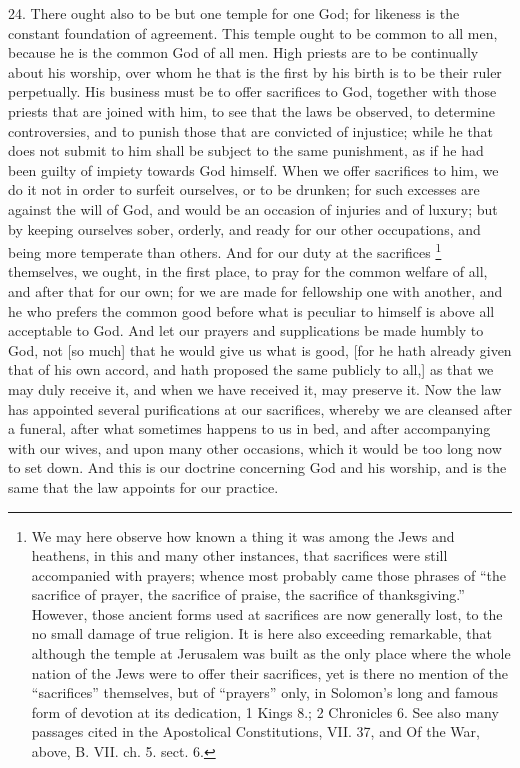 24. There ought also to be but one temple for one God; for likeness is the
constant foundation of agreement. This temple ought to be common to all
men, because he is the common God of all men. High priests are to be
continually about his worship, over whom he that is the first by his birth
is to be their ruler perpetually. His business must be to offer sacrifices
to God, together with those priests that are joined with him, to see that
the laws be observed, to determine controversies, and to punish those that
are convicted of injustice; while he that does not submit to him shall be
subject to the same punishment, as if he had been guilty of impiety
towards God himself. When we offer sacrifices to him, we do it not in
order to surfeit ourselves, or to be drunken; for such excesses are
against the will of God, and would be an occasion of injuries and of
luxury; but by keeping ourselves sober, orderly, and ready for our other
occupations, and being more temperate than others. And for our duty at the
sacrifices \footnote{We may here observe how
known a thing it was among the Jews and heathens, in this and many other
instances, that sacrifices were still accompanied with prayers; whence
most probably came those phrases of ``the sacrifice of prayer, the
sacrifice of praise, the sacrifice of thanksgiving.'' However, those
ancient forms used at sacrifices are now generally lost, to the no small
damage of true religion. It is here also exceeding remarkable, that
although the temple at Jerusalem was built as the only place where the
whole nation of the Jews were to offer their sacrifices, yet is there no
mention of the ``sacrifices'' themselves, but of ``prayers'' only, in
Solomon's long and famous form of devotion at its dedication, 1 Kings 8.;
2 Chronicles 6. See also many passages cited in the Apostolical
Constitutions, VII. 37, and Of the War, above, B. VII. ch. 5. sect. 6.} themselves, we ought, in the
first place, to pray for the common welfare of all, and after that for our
own; for we are made for fellowship one with another, and he who prefers
the common good before what is peculiar to himself is above all acceptable
to God. And let our prayers and supplications be made humbly to God, not
[so much] that he would give us what is good, [for he hath already given
that of his own accord, and hath proposed the same publicly to all,] as
that we may duly receive it, and when we have received it, may preserve
it. Now the law has appointed several purifications at our sacrifices,
whereby we are cleansed after a funeral, after what sometimes happens to
us in bed, and after accompanying with our wives, and upon many other
occasions, which it would be too long now to set down. And this is our
doctrine concerning God and his worship, and is the same that the law
appoints for our practice.

